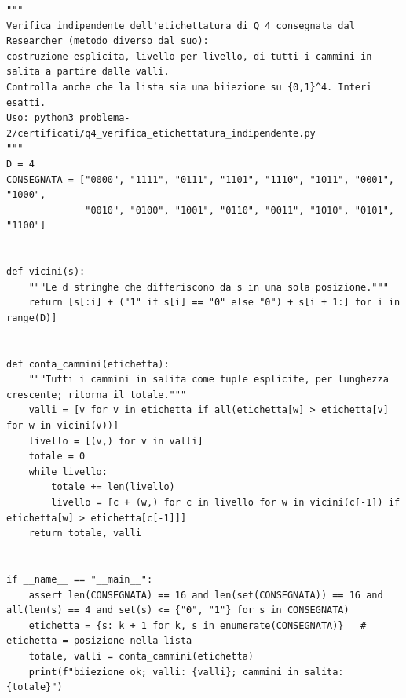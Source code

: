 \documentclass[11pt,a4paper]{article}
\begin{document}
\begin{lstlisting}[caption={certificati/q4\_verifica\_etichettatura\_indipendente.py}]
"""
Verifica indipendente dell'etichettatura di Q_4 consegnata dal Researcher (metodo diverso dal suo):
costruzione esplicita, livello per livello, di tutti i cammini in salita a partire dalle valli.
Controlla anche che la lista sia una biiezione su {0,1}^4. Interi esatti.
Uso: python3 problema-2/certificati/q4_verifica_etichettatura_indipendente.py
"""
D = 4
CONSEGNATA = ["0000", "1111", "0111", "1101", "1110", "1011", "0001", "1000",
              "0010", "0100", "1001", "0110", "0011", "1010", "0101", "1100"]


def vicini(s):
    """Le d stringhe che differiscono da s in una sola posizione."""
    return [s[:i] + ("1" if s[i] == "0" else "0") + s[i + 1:] for i in range(D)]


def conta_cammini(etichetta):
    """Tutti i cammini in salita come tuple esplicite, per lunghezza crescente; ritorna il totale."""
    valli = [v for v in etichetta if all(etichetta[w] > etichetta[v] for w in vicini(v))]
    livello = [(v,) for v in valli]
    totale = 0
    while livello:
        totale += len(livello)
        livello = [c + (w,) for c in livello for w in vicini(c[-1]) if etichetta[w] > etichetta[c[-1]]]
    return totale, valli


if __name__ == "__main__":
    assert len(CONSEGNATA) == 16 and len(set(CONSEGNATA)) == 16 and all(len(s) == 4 and set(s) <= {"0", "1"} for s in CONSEGNATA)
    etichetta = {s: k + 1 for k, s in enumerate(CONSEGNATA)}   # etichetta = posizione nella lista
    totale, valli = conta_cammini(etichetta)
    print(f"biiezione ok; valli: {valli}; cammini in salita: {totale}")

\end{lstlisting}
\end{document}

